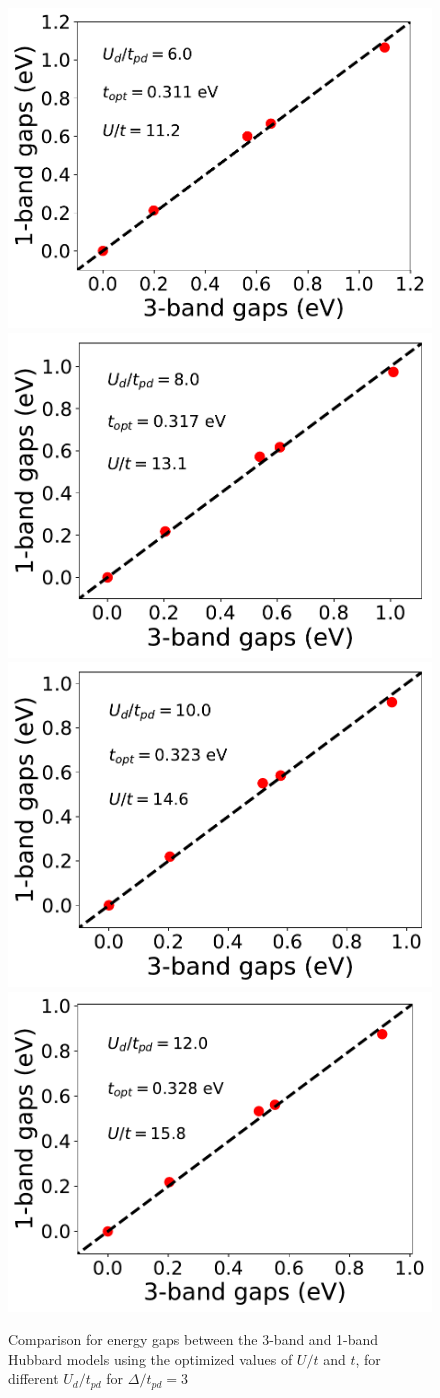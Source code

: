 \documentclass[prl,12pt,onecolumn,nofootinbib,notitlepage,english,superscriptaddress]{revtex4-1}
\begin{document}
\begin{figure}[htpb]
\centering
\includegraphics[width=0.49\linewidth]{./Gap_1_band_3_band_number_4.pdf}
\includegraphics[width=0.49\linewidth]{./Gap_1_band_3_band_number_6.pdf}
\includegraphics[width=0.49\linewidth]{./Gap_1_band_3_band_number_0.pdf}
\includegraphics[width=0.49\linewidth]{./Gap_1_band_3_band_number_2.pdf}
\caption{Comparison for energy gaps between the 3-band and 1-band Hubbard models using the optimized values of $U/t$ and $t$, for different
$U_{d}/t_{pd}$ for $\Delta/t_{pd}=3$}
\label{fig:hamfit} 
\end{figure}	
\end{document}
